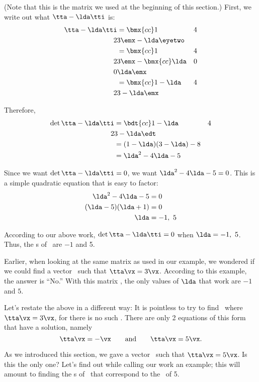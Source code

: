 {(Note that this is the matrix we used at the beginning of this section.) First, we write out what $\tta-\lda\tti$ is: 
\begin{align*}
\tta-\lda\tti &= \bmx{cc}1&4\\2&3\emx - \lda\eyetwo \\
							&= \bmx{cc}1&4\\2&3\emx - \bmx{cc}\lda&0\\0&\lda\emx\\
							&= \bmx{cc}1-\lda & 4 \\ 2&3-\lda\emx
\end{align*}

Therefore, 
\begin{align*}
\det{\tta-\lda\tti} &= \bdt{cc}1-\lda & 4 \\ 2&3-\lda\edt \\
										&= (1-\lda)(3-\lda)-8\\
										&= \lda^2-4\lda-5
\end{align*}

Since we want $\det{\tta-\lda\tti}=0$, we want $\lda^2-4\lda-5=0$. This is a simple quadratic equation that is easy to factor:
\begin{align*}
\lda^2-4\lda-5 &= 0\\
(\lda-5)(\lda+1) & = 0\\
\lda &= -1,\ 5
\end{align*}

According to our above work, $\det{\tta-\lda\tti}=0$ when $\lda = -1,\ 5$. Thus, the \el s of \tta\ are $-1$ and 5.}

\medskip

Earlier, when looking at the same matrix as used in our example, we wondered if we could find a vector \vx\ such that $\tta\vx=3\vx$. According to this example, the answer is ``No.'' With this matrix \tta, the only values of $\lda$ that work are $-1$ and $5$.

Let's restate the above in a different way: It is pointless to try to find \vx\ where $\tta\vx=3\vx$, for there is no such \vx. There are only 2 equations of this form that have a solution, namely 
\[
\tta\vx = -\vx \quad\quad \text{and} \quad \quad \tta\vx=5\vx.
\]

As we introduced this section, we gave a vector \vx\ such that $\tta\vx = 5\vx$. Is this the only one? Let's find out while calling our work an example; this will amount to finding the \ev s of \tta\ that correspond to the \ev\ of 5.

